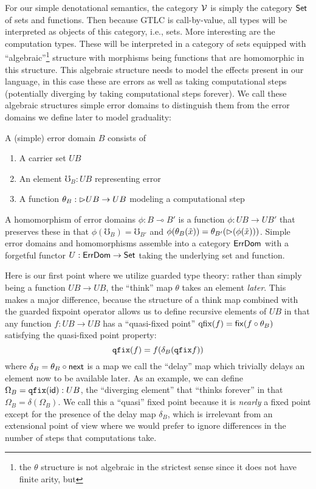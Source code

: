 For our simple denotational semantics, the category $\mathcal{V}$ is simply
the category $\mathsf{Set}$ of sets and functions. Then because GTLC is
call-by-value, all types will be interpreted as objects of this
category, i.e., sets. More interesting are the computation
types. These will be interpreted in a category of sets equipped with
``algebraic''\footnote{the $\theta$ structure is not algebraic in the
strictest sense since it does not have finite arity, but } structure
with morphisms being functions that are homomorphic in this structure.
This algebraic structure needs to model the effects present in our language,
in this case these are errors as well as taking computational steps
(potentially diverging by taking computational steps forever).
%
We call these algebraic structures simple error domains to distinguish
them from the error domains we define later to model graduality:
\begin{definition}
  A (simple) error domain $B$ consists of
  \begin{enumerate}
  \item A carrier set $UB$
  \item An element $\mho_{B} : UB$ representing error
  \item A function $\theta_B : {{\vartriangleright}} UB \to UB$ modeling a computational step
  \end{enumerate}
  A homomorphism of error domains $\phi : B \multimap B'$ is a
  function $\phi : UB \to UB'$ that preserves these in that
  $\phi(\mho_B) = \mho_{B'}$ and $\phi(\theta_{B}(\tilde{x})) =
  \theta_{B'}({\vartriangleright} (\phi(\tilde{x})))$.  Simple error domains and
  homomorphisms assemble into a category $\mathsf{ErrDom}$ with a forgetful
  functor $U : \mathsf{ErrDom} \to \mathsf{Set}$ taking the underlying set and
  function.
\end{definition}
Here is our first point where we utilize guarded type theory: rather
than simply being a function $UB \to UB$, the ``think'' map $\theta$
takes an element \emph{later}. This makes a major difference, because
the structure of a think map combined with the guarded fixpoint
operator allows us to define recursive elements of $UB$ in that any
function $f : UB \to UB$ has a ``quasi-fixed point'' $\textrm{qfix}(f)
= \mathsf{fix}(f \circ \theta_B)$ satisfying the quasi-fixed point property:
\[ \texttt{qfix}(f) = f(\delta_B(\texttt{qfix} f)) \]
where $\delta_B = \theta_B \circ \mathsf{next}$ is a map we call the ``delay''
map which trivially delays an element now to be available later.  As
an example, we can define $\Omega_B = \texttt{qfix}(\mathsf{id}) : UB$, the
``diverging element'' that ``thinks forever'' in that $\Omega_B =
\delta(\Omega_B)$. We call this a ``quasi'' fixed point because it is
\emph{nearly} a fixed point except for the presence of the delay map
$\delta_B$, which is irrelevant from an extensional point of view
where we would prefer to ignore differences in the number of steps
that computations take.

